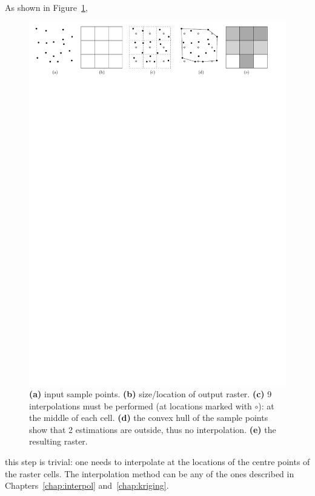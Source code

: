 As shown in Figure~\ref{fig:r-interpolation},
\begin{figure}
  \centering
  \includegraphics[width=\linewidth]{figs/r-interpolation}
  \caption{\textbf{(a)} input sample points. \textbf{(b)} size/location of output raster. \textbf{(c)} 9 interpolations must be performed (at locations marked with $\circ$): at the middle of each cell. \textbf{(d)} the convex hull of the sample points show that 2 estimations are outside, thus no interpolation. \textbf{(e)} the resulting raster.}%
\label{fig:r-interpolation}
\end{figure}
this step is trivial: one needs to interpolate at the locations of the centre points of the raster cells.
The interpolation method can be any of the ones described in Chapters~\ref{chap:interpol} and~\ref{chap:kriging}.






